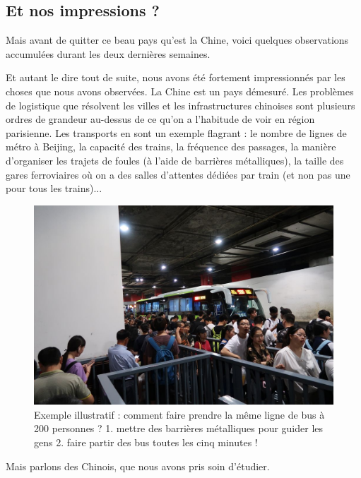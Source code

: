 \hypertarget{et-nos-impressions}{%
\subsection{Et nos impressions ?}\label{et-nos-impressions}}

Mais avant de quitter ce beau pays qu'est la Chine, voici quelques
observations accumulées durant les deux dernières semaines.

Et autant le dire tout de suite, nous avons été fortement impressionnés
par les choses que nous avons observées. La Chine est un pays démesuré.
Les problèmes de logistique que résolvent les villes et les
infrastructures chinoises sont plusieurs ordres de grandeur au-dessus de
ce qu'on a l'habitude de voir en région parisienne. Les transports en
sont un exemple flagrant : le nombre de lignes de métro à Beijing, la
capacité des trains, la fréquence des passages, la manière d'organiser
les trajets de foules (à l'aide de barrières métalliques), la taille des
gares ferroviaires où on a des salles d'attentes dédiées par train (et
non pas une pour tous les trains)...

\begin{figure}
\centering
\includegraphics{images/20180622_bus.JPG}
\caption{Exemple illustratif : comment faire prendre la même ligne de
bus à 200 personnes ? 1. mettre des barrières métalliques pour guider
les gens 2. faire partir des bus toutes les cinq minutes !}
\end{figure}

Mais parlons des Chinois, que nous avons pris soin d'étudier.

